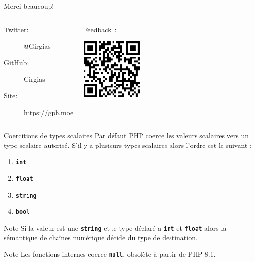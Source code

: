 \documentclass[10pt]{beamer}
\newcommand{\type}[1]{\texttt{\textbf{#1}}}
\begin{document}
{
\begin{frame}[standout]
    Merci beaucoup!
    \vfill
    \begin{columns}[T,onlytextwidth]
            \begin{center}
                \begin{description}
                    \item[Twitter:] @Girgias
                    \item[GitHub:] Girgias
                    \item[Site:] \url{https://gpb.moe}
                \end{description}
            \end{center}
            \begin{center}
                Feedback~:
                
                \vspace{0.5cm}
                \includegraphics[width=3cm]{images/Forum_PHP_2022_QRCode.png}
            \end{center}
    \end{columns}
\end{frame}
}

\appendix


\begin{frame}[fragile]{Coercitions de types scalaires}
    Par défaut PHP coerce les valeurs scalaires vers un type scalaire autorisé.
    S'il y a plusieurs types scalaires alors l'ordre est le suivant :
    \begin{enumerate}
        \item \type{int}
        \item \type{float}
        \item \type{string}
        \item \type{bool}
    \end{enumerate}
    \begin{exampleblock}{Note}
       Si la valeur est une \type{string} et le type déclaré a \type{int} et \type{float} alors la sémantique de chaînes numérique décide du type de destination.
    \end{exampleblock}
    \begin{exampleblock}{Note}
        Les fonctions internes coerce \type{null}, obsolète à partir de PHP 8.1.
    \end{exampleblock}
\end{frame}
\end{document}
